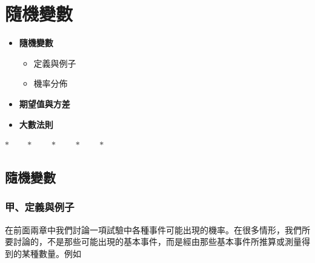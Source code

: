 \section{隨機變數}\label{sec:b5-ch5}

\begin{center}
\begin{minipage}{0.75\textwidth}
\begin{itemize}[leftmargin=2em, itemsep=0.3em]
  \item[*§ V-1] \textbf{隨機變數}
  \begin{itemize}[leftmargin=1.5em, itemsep=0.2em]
    \item[甲、] 定義與例子
    \item[乙、] 機率分佈
  \end{itemize}
  \item[§ V-2] \textbf{期望值與方差}
  \item[*§ V-3] \textbf{大數法則}
\end{itemize}
\end{minipage}
\end{center}

\begin{center}
$* \qquad * \qquad * \qquad * \qquad *$
\end{center}

\subsection{隨機變數}\label{sec:b5-5-1}
\setcounter{equation}{0}

\subsubsection*{甲、定義與例子}

在前面兩章中我們討論一項試驗中各種事件可能出現的機率。在很多情形，我們所要討論的，不是那些可能出現的基本事件，而是經由那些基本事件所推算或測量得到的某種數量。例如

